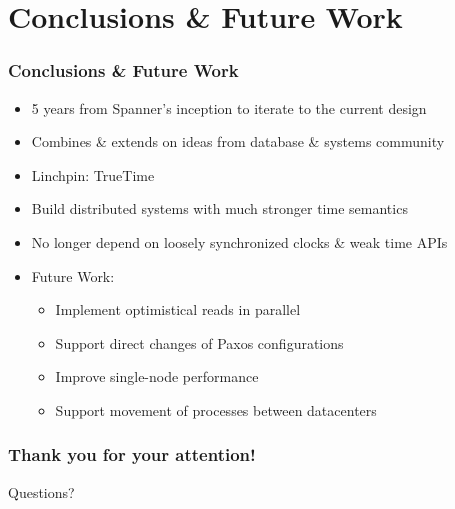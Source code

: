 \documentclass{beamer}
\begin{document}
\section{Conclusions \& Future Work}
\begin{frame}
  \frametitle{Conclusions \& Future Work}
  \begin{itemize}
    \item{5 years from Spanner's inception to iterate to the current design}
    \item{Combines \& extends on ideas from database \& systems community}
    \item{Linchpin: TrueTime}
    \item{Build distributed systems with much stronger time semantics}
    \item{No longer depend on loosely synchronized clocks \& weak time APIs}
    \pause
    \item{Future Work:}
    \begin{itemize}
      \item{Implement optimistical reads in parallel}
      \item{Support direct changes of Paxos configurations}
      \item{Improve single-node performance}
      \item{Support movement of processes between datacenters}
    \end{itemize}
  \end{itemize}
\end{frame}

\begin{frame}
	\frametitle{Thank you for your attention!}
	\begin{center}
		\huge{Questions?}
	\end{center}
\end{frame}
\end{document}
